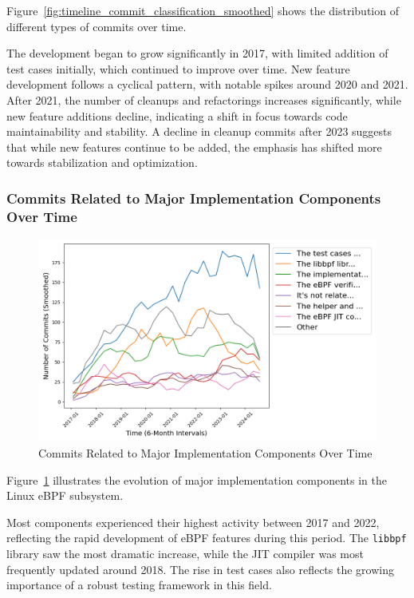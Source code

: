 Figure~\ref{fig:timeline_commit_classification_smoothed} shows the distribution of different types of commits over time.

The development began to grow significantly in 2017, with limited addition of test cases initially, which continued to improve over time. New feature development follows a cyclical pattern, with notable spikes around 2020 and 2021. After 2021, the number of cleanups and refactorings increases significantly, while new feature additions decline, indicating a shift in focus towards code maintainability and stability. A decline in cleanup commits after 2023 suggests that while new features continue to be added, the emphasis has shifted more towards stabilization and optimization.

\subsubsection{Commits Related to Major Implementation Components Over Time}

\begin{figure}[ht]
    \centering
    \includegraphics[width=\linewidth]{feature-analysis/timeline_major_related_implementation_component_smoothed.png}
    \caption{Commits Related to Major Implementation Components Over Time}
    \label{fig:timeline_major_related_implementation_component_smoothed}
\end{figure}

Figure~\ref{fig:timeline_major_related_implementation_component_smoothed} illustrates the evolution of major implementation components in the Linux eBPF subsystem.

Most components experienced their highest activity between 2017 and 2022, reflecting the rapid development of eBPF features during this period. The \texttt{libbpf} library saw the most dramatic increase, while the JIT compiler was most frequently updated around 2018. The rise in test cases also reflects the growing importance of a robust testing framework in this field.

